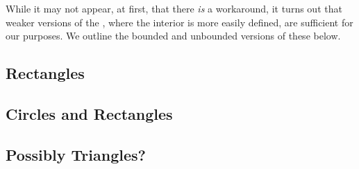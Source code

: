 While it may not appear, at first, that there \textit{is} a workaround, it turns out that weaker versions of the \CGT, where the interior is more easily defined, are sufficient for our purposes. We outline the bounded and unbounded versions of these below.


\subsection{Rectangles}

\subsection{Circles and Rectangles}

\subsection{Possibly Triangles?}